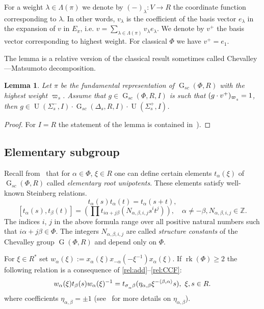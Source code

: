 \documentclass[12pt]{amsart}
\numberwithin{equation}{section}
\newtheorem{lemma}[lemmacounter]{Lemma}
\theoremstyle{definition}
\DeclareMathOperator{\G}{G}
\DeclareMathOperator{\U}{U}
\DeclareMathOperator{\rk}{rk}
\def\ssub#1{\mathchoice
   {_{\lower2pt\hbox{$\scriptstyle #1$}}}
   {_{\lower2pt\hbox{$\scriptstyle #1$}}}
   {_{\lower1.5pt\hbox{$\scriptscriptstyle #1$}}}
   {_{\!\lower1.5pt\hbox{$\scriptscriptstyle #1$}}}}
\begin{document}
For a weight $\lambda\in \Lambda(\pi)$ we denote by $(-)_\lambda\colon V\rightarrow R$ the coordinate function corresponding to $\lambda$.
In other words,  $v_\lambda$ is the coefficient of the basis vector $e_\lambda$ in the expansion of $v$ in $E_\pi$, i.e. $v=\sum_{\lambda\in \Lambda(\pi)} v_\lambda e_\lambda$.
We denote by $v^+$ the basis vector corresponding to highest weight.
For classical $\Phi$ we have $v^+=e_1$.

The lemma is a relative version of the classical result sometimes called Chevalley---Matsumoto decomposition.
\begin{lemma}\label{lemma:Chevalley-Matsumoto}
Let $\pi$ be the fundamental representation of $\G_{sc}(\Phi, R)$ with the highest weight $\varpi_s$.
Assume that $g\in \G_{sc}(\Phi, R, I)$ is such that $(g\cdot v^+)_{\varpi\ssub{s}}=1$, then 
$g \in \U(\Sigma_s^-, I) \cdot \G_{sc}(\Delta_s, R, I) \cdot \U(\Sigma_s^+, I)$.
\end{lemma} \begin{proof}  For $I=R$ the statement of the lemma is contained in~\cite[Theorem~1.3]{St78}). \end{proof}


\subsection{Elementary subgroup}
Recall from~\cite{St78, VP} that for $\alpha\in \Phi$, $\xi\in R$ one can define certain elements $t_{\alpha}(\xi)$ of $\G_{sc}(\Phi, R)$ called {\it elementary root unipotents}.
These elements satisfy well-known Steinberg relations.
\begin{equation}\label{rel:add} t_\alpha(s) t_\alpha(t) = t_\alpha(s+t), \end{equation} 
\begin{equation}\label{rel:CCF} [t_\alpha(s),  t_\beta(t)] = \left(\prod\limits t_{i\alpha + j\beta}(N_{\alpha,\beta, i, j}s^i t^j)\right),\quad \alpha\neq-\beta, N_{\alpha, \beta, i, j}\in\mathbb{Z}.\end{equation}
The indices $i$, $j$ in the above formula range over all positive natural numbers such that $i\alpha + j\beta\in\Phi$.
The integers $N_{\alpha, \beta, i, j}$ are called {\it structure constants} of the Chevalley group $\G(\Phi,R)$ and depend only on $\Phi$.

For $\xi\in R^*$ set $w_\alpha(\xi) := x_\alpha(\xi) x_{-\alpha}(-\xi^{-1}) x_{\alpha}(\xi).$
If $\rk(\Phi)\geq 2$ the following relation is a consequence of \ref{rel:add}--\ref{rel:CCF}:
\begin{equation}\label{rel:R3} w_\alpha(\xi) t_{\beta}(s) w_\alpha(\xi)^{-1} =
t_{\sigma\ssub{\alpha}\beta} (\eta_{\alpha, \beta}\xi^{-\langle\beta,\alpha \rangle} s),\ \xi,s\in R. \end{equation}
where coefficients $\eta_{\alpha, \beta} = \pm 1$ (see~\cite[\S13]{VP} for more details on $\eta_{\alpha, \beta}$).
\end{document}
